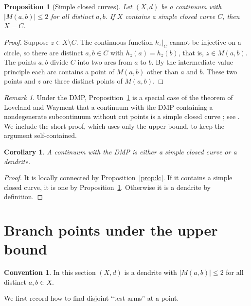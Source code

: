 \documentclass[11pt]{amsart}
\newtheorem{proposition}[theorem]{Proposition}
\newtheorem{corollary}[theorem]{Corollary}
\theoremstyle{definition}
\newtheorem{convention}[theorem]{Convention}
\theoremstyle{remark}
\newtheorem{remark}[theorem]{Remark}
\newcommand{\M}{M}
\begin{document}
\begin{proposition}[Simple closed curves]\label{prop:circle}
Let $(X,d)$ be a continuum with $|\M(a,b)|\le2$ for all distinct $a,b$. If $X$ contains a simple closed curve $C$, then $X=C$.
\end{proposition}
\begin{proof}
Suppose $z\in X\setminus C$. The continuous function $h_z|_C$ cannot be injective on a circle, so there are distinct $a,b\in C$ with $h_z(a)=h_z(b)$, that is, $z\in\M(a,b)$. The points $a,b$ divide $C$ into two arcs from $a$ to $b$. By the intermediate value principle each arc contains a point of $\M(a,b)$ other than $a$ and $b$. These two points and $z$ are three distinct points of $\M(a,b)$.
\end{proof}

\begin{remark}
Under the DMP, Proposition~\ref{prop:circle} is a special case of the theorem of Loveland and Wayment that a continuum with the DMP containing a nondegenerate subcontinuum without cut points is a simple closed curve \cite{LW74}; see \cite[Theorem~6(a)]{H01}. We include the short proof, which uses only the upper bound, to keep the argument self-contained.
\end{remark}

\begin{corollary}\label{cor:dendrite}
A continuum with the DMP is either a simple closed curve or a dendrite.
\end{corollary}
\begin{proof}
It is locally connected by Proposition~\ref{prop:lc}. If it contains a simple closed curve, it is one by Proposition~\ref{prop:circle}. Otherwise it is a dendrite by definition.
\end{proof}

\section{Branch points under the upper bound}\label{sec:branch}

\begin{convention}\label{conv:upper}
In this section $(X,d)$ is a dendrite with $|\M(a,b)|\le2$ for all distinct $a,b\in X$.
\end{convention}

We first record how to find disjoint ``test arms'' at a point.
\end{document}
